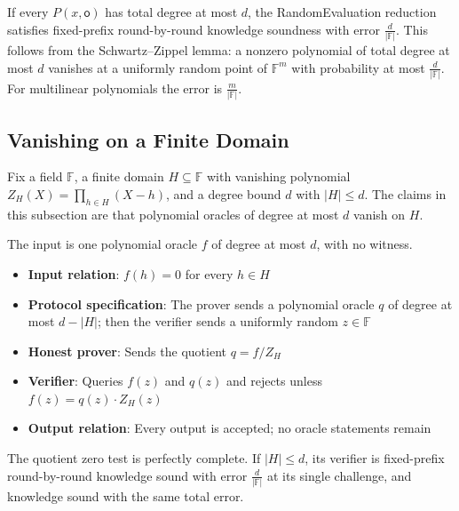 \begin{theorem}
    If every $P(x, \mathsf{o})$ has total degree at most $d$, the RandomEvaluation reduction satisfies fixed-prefix round-by-round knowledge soundness with error $\frac{d}{|\mathbb{F}|}$. This follows from the Schwartz--Zippel lemma: a nonzero polynomial of total degree at most $d$ vanishes at a uniformly random point of $\mathbb{F}^m$ with probability at most $\frac{d}{|\mathbb{F}|}$. For multilinear polynomials the error is $\frac{m}{|\mathbb{F}|}$.
    \leanok
\end{theorem}

\subsection{Vanishing on a Finite Domain}

Fix a field $\mathbb{F}$, a finite domain $H \subseteq \mathbb{F}$ with vanishing polynomial $Z_H(X) = \prod_{h \in H} (X - h)$, and a degree bound $d$ with $|H| \leq d$. The claims in this subsection are that polynomial oracles of degree at most $d$ vanish on $H$.

\begin{definition}
    \label{def:quotient_zero_test}
    The input is one polynomial oracle $f$ of degree at most $d$, with no witness.
    \begin{itemize}
        \item \textbf{Input relation}: $f(h) = 0$ for every $h \in H$
        \item \textbf{Protocol specification}: The prover sends a polynomial oracle $q$ of degree at most $d - |H|$; then the verifier sends a uniformly random $z \in \mathbb{F}$
        \item \textbf{Honest prover}: Sends the quotient $q = f / Z_H$
        \item \textbf{Verifier}: Queries $f(z)$ and $q(z)$ and rejects unless $f(z) = q(z) \cdot Z_H(z)$
        \item \textbf{Output relation}: Every output is accepted; no oracle statements remain
    \end{itemize}
    \leanok
\end{definition}

\begin{theorem}
    The quotient zero test is perfectly complete. If $|H| \leq d$, its verifier is fixed-prefix round-by-round knowledge sound with error $\frac{d}{|\mathbb{F}|}$ at its single challenge, and knowledge sound with the same total error.
    \leanok
\end{theorem}

